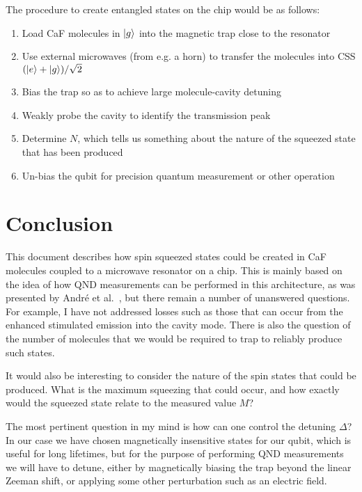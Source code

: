 \documentclass{article}
\begin{document}
The procedure to create entangled states on the chip would be as follows:

\begin{enumerate}
  \item Load CaF molecules in $\ket{g}$ into the magnetic trap close to the
    resonator
  \item Use external microwaves (from e.g. a horn) to transfer the molecules
    into CSS $(\ket{e} + \ket{g})/\sqrt{2}$
  \item Bias the trap so as to achieve large molecule-cavity detuning
  \item Weakly probe the cavity to identify the transmission peak
  \item Determine $N$, which tells us something about the nature of the
    squeezed state that has been produced
  \item Un-bias the qubit for precision quantum measurement or other operation
\end{enumerate}

\section{Conclusion}

This document describes how spin squeezed states could be created in CaF
molecules coupled to a microwave resonator on a chip. This is mainly based on
the idea of how QND measurements can be performed in this architecture, as was
presented by Andr\'e et al.~\cite{Andre2006}, but there remain a number of
unanswered questions. For example, I have not addressed losses such as those
that can occur from the enhanced stimulated emission into the cavity mode.
There is also the question of the number of molecules that we would be required
to trap to reliably produce such states.

It would also be interesting to consider the nature of the spin states that
could be produced. What is the maximum squeezing that could occur, and how
exactly would the squeezed state relate to the measured value $M$?

The most pertinent question in my mind is how can one control the detuning
$\Delta$? In our case we have chosen magnetically insensitive states for our
qubit, which is useful for long lifetimes, but for the purpose of performing
QND measurements we will have to detune, either by magnetically biasing the
trap beyond the linear Zeeman shift, or applying some other perturbation
such as an electric field.
\end{document}
